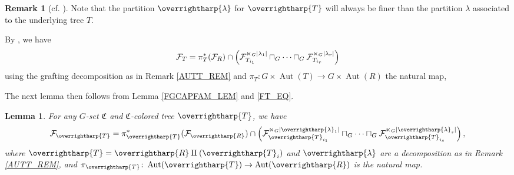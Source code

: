 \documentclass[a4paper,10pt
,draft
]{article}%
\numberwithin{equation}{section}
\numberwithin{figure}{section}
\newtheorem{lemma}[equation]{Lemma}%
\theoremstyle{definition} %
\newtheorem{remark}[equation]{Remark}%
\newcommand{\set}[1]{\left\{#1\right\}}%
\newcommand{\vect}[1]{\text{\overrightharp{\ensuremath{#1}}}}
\DeclareMathOperator{\Aut}{Aut}%
\newcommand{\F}{\ensuremath{\mathcal F}}
\newcommand{\1}{\ensuremath{\mathbbm 1}}%
\begin{document}
{\begin{remark}[{cf. \cite[Remark 6.48]{BP_geo}}]
        Note that the partition $\vect \lambda$ for $\vect T$ will always be finer than
        the partition $\lambda$ associated to the underlying tree $T$.
  \end{remark}

  By \cite[Lemma 6.49]{BP_geo}, we have
  \begin{equation}
        \label{FT_EQ}
        \F_T = \pi_T^{\**}(\F_R) \cap \left( \F_{T_{i_1}}^{\ltimes_G |\lambda_1|} \sqcap_G \dots \sqcap_G \F_{T_{i_r}}^{\ltimes_G |\lambda_r|} \right)
  \end{equation}
  using the grafting decomposition as in Remark \ref{AUTT_REM} 
  and $\pi_{T} \colon G \times \Aut(T) \to G \times \Aut(R)$ the natural map,

  The next lemma then follows from Lemma \ref{FGCAPFAM_LEM} and \eqref{FT_EQ}.
  \begin{lemma}
        \label{FVECTT_LEM}
        For any $G$-set $\mathfrak C$ and $\mathfrak C$-colored tree $\vect T$, we have
        \begin{equation}
              \label{FVECTT_EQ}
              \F_{\vect T} =
              \pi_{\vect T}^{\**}(\F_{\vect R}) \cap
              \left( \F_{\vect T_{i_1}}^{\ltimes_G |\vect \lambda_1|} \sqcap_G \dots \sqcap_G \F_{\vect T_{i_s}}^{\ltimes_G |\vect \lambda_s|} \right),
        \end{equation}
        where $\vect T = \vect R \amalg (\vect T_i)$ and $\vect \lambda$ are a decomposition as in Remark \ref{AUTT_REM},
        and $\pi_{\vect T} \colon \Aut(\vect T) \to \Aut(\vect R)$ is the natural map.
  \end{lemma}



}
\end{document}
